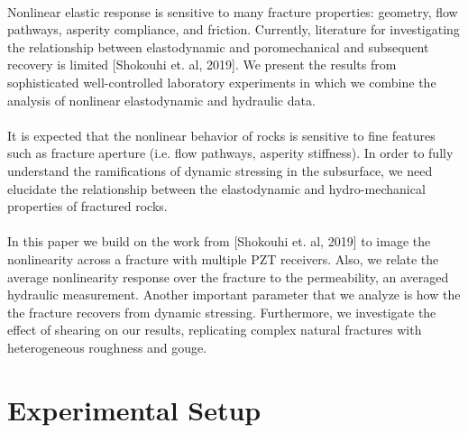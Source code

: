 \documentclass[letterpaper,10pt]{article}
\begin{document}
\paragraph{} Nonlinear elastic response is sensitive to many fracture properties: geometry, flow pathways, asperity compliance, and friction. Currently, literature for investigating the relationship between elastodynamic and poromechanical and subsequent recovery is limited [Shokouhi et. al, 2019]. We present the results from sophisticated well-controlled laboratory experiments in which we combine the analysis of nonlinear elastodynamic and hydraulic data.

\paragraph{} It is expected that the nonlinear behavior of rocks is sensitive to fine features such as fracture aperture (i.e. flow pathways, asperity stiffness). In order to fully understand the ramifications of dynamic stressing in the subsurface, we need elucidate the relationship between the elastodynamic and hydro-mechanical properties of fractured rocks.

\paragraph{}
In this paper we build on the work from [Shokouhi et. al, 2019] to image the nonlinearity across a fracture with multiple PZT receivers. Also, we relate the average nonlinearity response over the fracture to the permeability, an averaged hydraulic measurement. Another important parameter that we analyze is how the the fracture recovers from dynamic stressing. Furthermore, we investigate the effect of shearing on our results, replicating complex natural fractures with heterogeneous roughness and gouge.     



\section{Experimental Setup}
\label{sec:experimnt_setup}
\end{document}
